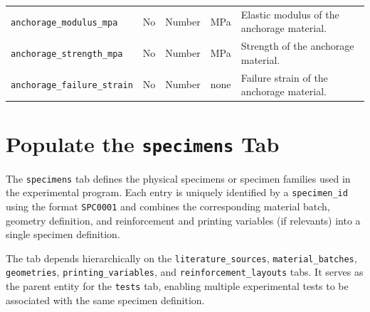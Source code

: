 \documentclass[11pt]{book}
\begin{document}
\begin{longtable}{p{}p{}p{}p{}p{}}
\texttt{anchorage\_modulus\_mpa} &
No &
Number &
MPa &
Elastic modulus of the anchorage material. \\

\texttt{anchorage\_strength\_mpa} &
No &
Number &
MPa &
Strength of the anchorage material. \\

\texttt{anchorage\_failure\_strain} &
No &
Number &
none &
Failure strain of the anchorage material. \\

\hline

\end{longtable}







\section{Populate the \texttt{specimens} Tab}

The \texttt{specimens} tab defines the physical specimens or specimen families used in the experimental program. Each entry is uniquely identified by a \texttt{specimen\_id} using the format \texttt{SPC0001} and combines the corresponding material batch, geometry definition, and reinforcement and printing variables (if relevants) into a single specimen definition.

The tab depends hierarchically on the \texttt{literature\_sources}, \texttt{material\_batches}, \texttt{geometries}, \texttt{printing\_variables}, and \texttt{reinforcement\_layouts} tabs. It serves as the parent entity for the \texttt{tests} tab, enabling multiple experimental tests to be associated with the same specimen definition.
\end{document}
